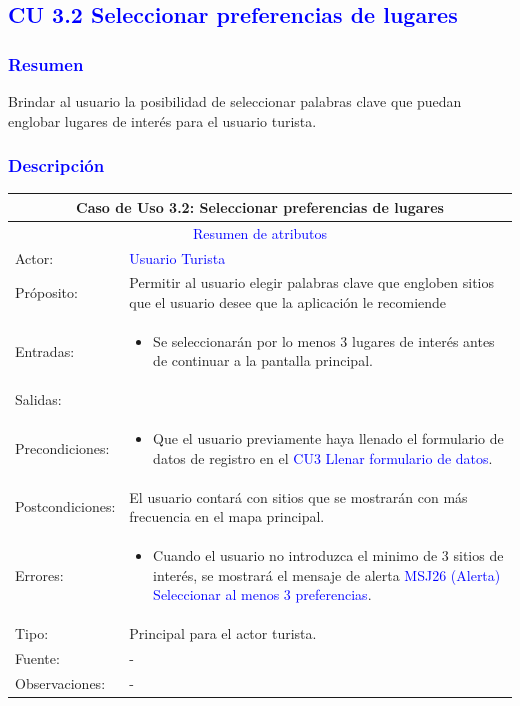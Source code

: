 

\subsection{\textcolor{blue}{CU 3.2 Seleccionar preferencias de lugares}}
\subsubsection{\textcolor{blue}{Resumen}}
Brindar al usuario la posibilidad de seleccionar palabras clave que puedan englobar lugares de interés para el usuario turista. 
\subsubsection{\textcolor{blue}{Descripción}}
\begin{tabularx}{16cm}{||l|X||}
	\hline
	\multicolumn{2}{||c||}{Caso de Uso 3.2: Seleccionar preferencias de lugares }  \\
	\hline
	\multicolumn{2}{||c||}{\textcolor{blue}{Resumen de atributos}} \\
	\hline
	{Actor:} & {\textcolor{blue}{Usuario Turista}} \\
	\hline
	{Próposito:} & {Permitir al usuario elegir palabras clave que engloben sitios que el usuario desee que la aplicación le recomiende} \\
	\hline
	{Entradas:} & {\begin{itemize}
            \item  Se seleccionarán por lo menos 3 lugares de interés antes de continuar a la pantalla principal.
        \end{itemize}}\\
	\hline
	{Salidas:} & {\begin{itemize}

        \end{itemize}}\\
	\hline
	{Precondiciones:} & { \begin{itemize}
            \item  Que el usuario previamente haya llenado el formulario de datos de registro en el {\textcolor{blue}{CU3 Llenar formulario de datos}}.
        \end{itemize}}\\ 
	\hline
	{Postcondiciones:} & {El usuario contará con sitios que se mostrarán con más frecuencia en el mapa principal.}\\
	\hline
	{Errores:} & \begin{itemize}
            \item Cuando el usuario no introduzca el minimo de 3 sitios de interés, se mostrará el mensaje de alerta {\textcolor{blue}{MSJ26 (Alerta) Seleccionar al menos 3 preferencias}}.
        \end{itemize} \\
	\hline
	{Tipo:} & {Principal para el actor turista.}\\
	\hline
	{Fuente:} & {-} \\
	\hline
	{Observaciones:} & {-} \\
	\hline
\end{tabularx}
